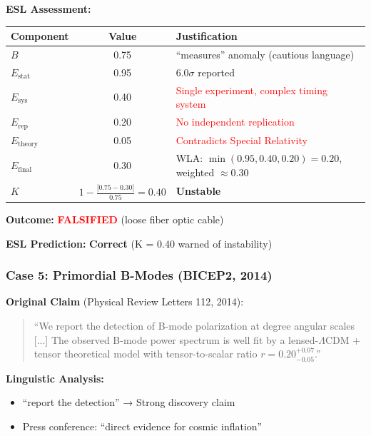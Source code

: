 \documentclass[11pt,a4paper]{article}
\begin{document}
\textbf{ESL Assessment:}
\begin{center}
\begin{tabular}{lcl}
\toprule
\textbf{Component} & \textbf{Value} & \textbf{Justification} \\
\midrule
$B$ & 0.75 & ``measures'' anomaly (cautious language) \\
$E_{\text{stat}}$ & 0.95 & $6.0\sigma$ reported \\
$E_{\text{sys}}$ & 0.40 & \textcolor{red}{Single experiment, complex timing system} \\
$E_{\text{rep}}$ & 0.20 & \textcolor{red}{No independent replication} \\
$E_{\text{theory}}$ & 0.05 & \textcolor{red}{Contradicts Special Relativity} \\
\midrule
$E_{\text{final}}$ & 0.30 & WLA: $\min(0.95, 0.40, 0.20) = 0.20$, weighted $\approx 0.30$ \\
\midrule
$K$ & $1 - \frac{|0.75 - 0.30|}{0.75} = 0.40$ & \textbf{Unstable} \\
\bottomrule
\end{tabular}
\end{center}

\textbf{Outcome:} \textcolor{red}{\textbf{FALSIFIED}} (loose fiber optic cable)

\textbf{ESL Prediction:} \checkmark \textbf{Correct} (K = 0.40 warned of instability)

\subsubsection{Case 5: Primordial B-Modes (BICEP2, 2014)}

\textbf{Original Claim} (Physical Review Letters 112, 2014):
\begin{quote}
``We report the detection of B-mode polarization at degree angular scales [...] The observed B-mode power spectrum is well fit by a lensed-$\Lambda$CDM + tensor theoretical model with tensor-to-scalar ratio $r = 0.20^{+0.07}_{-0.05}$.''
\end{quote}

\textbf{Linguistic Analysis:}
\begin{itemize}
    \item ``report the detection'' → Strong discovery claim
    \item Press conference: ``direct evidence for cosmic inflation''
\end{itemize}
\end{document}
